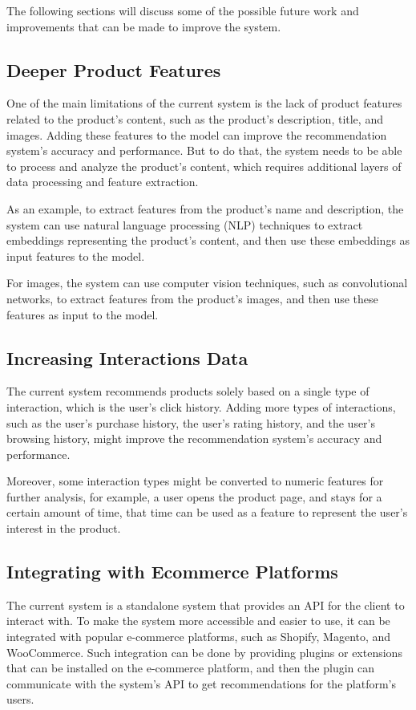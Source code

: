 The following sections will discuss some of the possible future work and improvements that can be made to improve the system.

\subsection{Deeper Product Features}

One of the main limitations of the current system is the lack of product features related to the product's content, such as the product's description, title, and images.
Adding these features to the model can improve the recommendation system's accuracy and performance. 
But to do that, the system needs to be able to process and analyze the product's content, which requires additional layers of data processing and feature extraction.

As an example, to extract features from the product's name and description, the system can use natural language processing (NLP) 
techniques to extract embeddings representing the product's content, and then use these embeddings as input features to the model.

For images, the system can use computer vision techniques, such as convolutional networks, to extract features from the product's images, and then use these features as input to the model.

\subsection{Increasing Interactions Data}

The current system recommends products solely based on a single type of interaction, which is the user's click history.
Adding more types of interactions, such as the user's purchase history, the user's rating history, and the user's browsing history, 
might improve the recommendation system's accuracy and performance.

Moreover, some interaction types might be converted to numeric features for further analysis,
 for example, a user opens the product page, and stays for a certain amount of time, 
 that time can be used as a feature to represent the user's interest in the product.

 \subsection{Integrating with Ecommerce Platforms}

The current system is a standalone system that provides an API for the client to interact with.
To make the system more accessible and easier to use, it can be integrated with popular e-commerce platforms, such as Shopify, Magento, and WooCommerce.
Such integration can be done by providing plugins or extensions that can be installed on the e-commerce platform, 
and then the plugin can communicate with the system's API to get recommendations for the platform's users.

